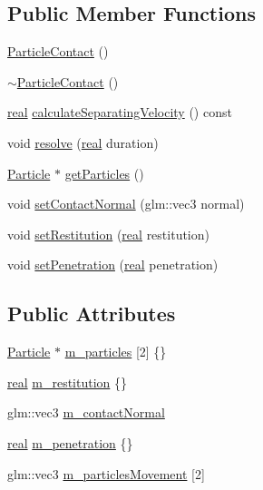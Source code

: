 \subsection*{Public Member Functions}
\begin{DoxyCompactItemize}
\item 
\mbox{\hyperlink{classr3_1_1_particle_contact_a57d3527a606d63a48816aae93d403eee}{Particle\+Contact}} ()
\item 
\mbox{\hyperlink{classr3_1_1_particle_contact_ab6524a4421fd38a282fecaf013d053a2}{$\sim$\+Particle\+Contact}} ()
\item 
\mbox{\hyperlink{namespacer3_ab2016b3e3f743fb735afce242f0dc1eb}{real}} \mbox{\hyperlink{classr3_1_1_particle_contact_a50956285c7722f209ffa5f851502e6d9}{calculate\+Separating\+Velocity}} () const
\item 
void \mbox{\hyperlink{classr3_1_1_particle_contact_a2878440163ead45a12454b90d3d1d774}{resolve}} (\mbox{\hyperlink{namespacer3_ab2016b3e3f743fb735afce242f0dc1eb}{real}} duration)
\item 
\mbox{\hyperlink{classr3_1_1_particle}{Particle}} $\ast$ \mbox{\hyperlink{classr3_1_1_particle_contact_aeeacfbf5cbed36cf2be65775066e8f14}{get\+Particles}} ()
\item 
void \mbox{\hyperlink{classr3_1_1_particle_contact_af5e7947a6ee4d6e32eb39578fe978ab6}{set\+Contact\+Normal}} (glm\+::vec3 normal)
\item 
void \mbox{\hyperlink{classr3_1_1_particle_contact_ad4e76907d589db86ef3e3ff767c3bb6e}{set\+Restitution}} (\mbox{\hyperlink{namespacer3_ab2016b3e3f743fb735afce242f0dc1eb}{real}} restitution)
\item 
void \mbox{\hyperlink{classr3_1_1_particle_contact_ade0d7d9fddc11108eacd522cb03b2ffd}{set\+Penetration}} (\mbox{\hyperlink{namespacer3_ab2016b3e3f743fb735afce242f0dc1eb}{real}} penetration)
\end{DoxyCompactItemize}
\subsection*{Public Attributes}
\begin{DoxyCompactItemize}
\item 
\mbox{\hyperlink{classr3_1_1_particle}{Particle}} $\ast$ \mbox{\hyperlink{classr3_1_1_particle_contact_a5ada81ede4e36c881f03a519bb38e0a5}{m\+\_\+particles}} \mbox{[}2\mbox{]} \{\}
\item 
\mbox{\hyperlink{namespacer3_ab2016b3e3f743fb735afce242f0dc1eb}{real}} \mbox{\hyperlink{classr3_1_1_particle_contact_ad5c4ed20d7bed8526d4e9ae918d2f74f}{m\+\_\+restitution}} \{\}
\item 
glm\+::vec3 \mbox{\hyperlink{classr3_1_1_particle_contact_a4cc7097057e4985e2f102eace531c2a2}{m\+\_\+contact\+Normal}}
\item 
\mbox{\hyperlink{namespacer3_ab2016b3e3f743fb735afce242f0dc1eb}{real}} \mbox{\hyperlink{classr3_1_1_particle_contact_a9c0b9355187b9cb9339f108da11f4244}{m\+\_\+penetration}} \{\}
\item 
glm\+::vec3 \mbox{\hyperlink{classr3_1_1_particle_contact_a07cacabf6612218466b393091db97ec6}{m\+\_\+particles\+Movement}} \mbox{[}2\mbox{]}
\end{DoxyCompactItemize}
